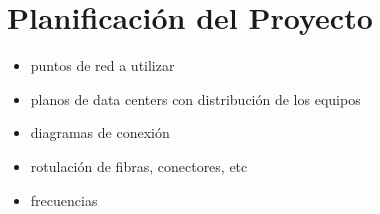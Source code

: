 \section{Planificaci\'on del Proyecto}\label{sec:planificacion}

\begin{itemize}
\item puntos de red a utilizar
\item planos de data centers con distribución de los equipos
\item diagramas de conexión
\item rotulación de fibras, conectores, etc
\item frecuencias
\end{itemize}
